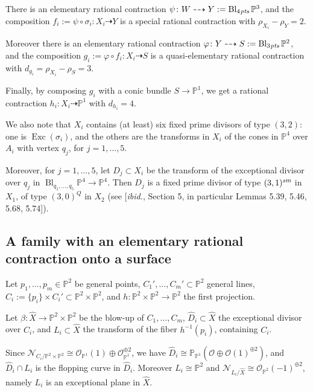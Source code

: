 \documentclass[a4paper,12pt]{amsart}
\theoremstyle{definition}
\numberwithin{figure}{section}
\numberwithin{table}{section}
\newcommand{\ph}{\varphi}
\newcommand{\ma}{\mathcal}
\newcommand{\ol}{\mathcal{O}}
\newcommand{\wi}{\widehat}
\newcommand{\pr}{\mathbb{P}}
\newcommand{\Exc}{\operatorname{Exc}}
\newcommand{\Bl}{\operatorname{Bl}}
\newcommand{\sm}{\text{\it sm}}
\newcommand{\pts}{\text{\it pts}}
\begin{document}
There is an elementary rational contraction $\psi\colon W\dasharrow Y:=
\Bl_{4\mskip1mu\pts}\pr^3$, and the composition $f_i:=\psi\circ \sigma_i\colon X_i\dasharrow Y$
is a
special rational contraction with $\rho_{X_i}-\rho_{Y}=2$.

Moreover there is an elementary rational contraction $\ph\colon Y\dasharrow S:=\Bl_{3\mskip1mu\pts}\pr^2$, and
the composition $g_i:=\ph\circ f_i\colon X_i\dasharrow S$ is a  quasi-elementary rational contraction with  $d_{g_i}=\rho_{X_i}-\rho_S=3$.

Finally, by composing $g_i$ with a conic bundle $S\to\pr^1$, we get a rational contraction $h_i\colon X_i\dasharrow\pr^1$ with $d_{h_i}=4$.

We also note that $X_i$ contains (at least) six fixed prime divisors of type $(3,2)$: one is $\Exc(\sigma_i)$, and the others are the transforms in $X_i$ of the cones in $\pr^4$ over $A_i$ with vertex $q_j$, for $j=1,\dotsc,5$.

Moreover, for $j=1,\dotsc,5$, let $D_j\subset X_i$ be the transform of the exceptional divisor over $q_j$ in $\Bl_{q_1,\dotsc,q_5}\pr^4\to\pr^4$. Then $D_j$ is a fixed prime divisor 
 of type $(3,1)^{\sm}$ in $X_1$, of type $(3,0)^Q$ in $X_2$  (see [\emph{ibid.}, Section 5, in particular Lemmas 5.39, 5.46, 5.68, 5.74]).
\subsection{A family with an elementary rational contraction onto a surface}
\label{Y}
 \noindent Let $p_1,\dotsc,p_m\in\pr^2$ be general points, $C_1',\dotsc,C_m'\subset\pr^2$ general lines,  $C_i:=\{p_i\}\times C_i'\subset\pr^2\times\pr^2$, and $h\colon \pr^2\times\pr^2\to\pr^2$ the first projection.
  
  Let $\beta\colon\wi{X}\to\pr^2\times\pr^2$ be the blow-up of $C_1,\dotsc,C_m$,   $\wi{D}_i\subset\wi{X}$ the exceptional divisor over $C_i$, and $L_i\subset \wi{X}$ the transform of the fiber $h^{-1}(p_i)$, containing $C_i$.

 Since $\ma{N}_{C_i/\pr^2\times\pr^2}\cong\ol_{\pr^1}(1)\oplus\ol_{\pr^1}^{\oplus 2}$, we have $\wi{D}_i\cong\pr_{\pr^1}(\ol\oplus\ol(1)^{\oplus 2})$, and $\wi{D}_i\cap L_i$ is the flopping curve in $\wi{D}_i$.
 Moreover  $L_i\cong\pr^2$ and  $\ma{N}_{L_i/\wi{X}}\cong\ol_{\pr^2}(-1)^{\oplus 2}$, namely $L_i$ is an exceptional plane in $\wi{X}$.
\end{document}
